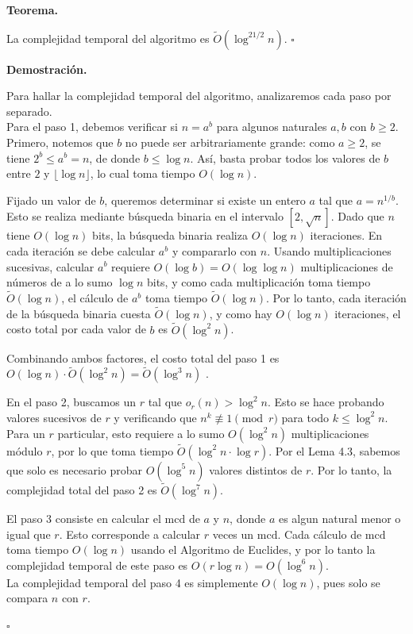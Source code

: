 \documentclass{article}
\newenvironment{dem}{\par\noindent\textbf{Demostración.}\par}{\hfill$\square$\par}
\newenvironment{teo}{\par\noindent\textbf{Teorema.}\par}{\hfill$\square$\par}
\begin{document}
\begin{teo}
La complejidad temporal del algoritmo es $\tilde{O}(\log^{21/2} n)$.
\end{teo}

\begin{dem}
Para hallar la complejidad temporal del algoritmo, analizaremos cada paso por separado. \\
Para el paso 1, debemos verificar si $n = a^b$ para algunos naturales $a, b$ con $b \geq 2$.
Primero, notemos que $b$ no puede ser arbitrariamente grande: como $a \geq 2$, se tiene
$2^b \leq a^b = n$, de donde $b \leq \log n$. Así, basta probar todos los valores de $b$
entre $2$ y $\lfloor \log n \rfloor$, lo cual toma tiempo $O(\log n)$.

Fijado un valor de $b$, queremos determinar si existe un entero $a$ tal que $a = n^{1/b}$.
Esto se realiza mediante búsqueda binaria en el intervalo $[2, \sqrt{n}]$. Dado que $n$
tiene $O(\log n)$ bits, la búsqueda binaria realiza $O(\log n)$ iteraciones. En cada
iteración se debe calcular $a^b$ y compararlo con $n$. Usando multiplicaciones sucesivas,
calcular $a^b$ requiere $O(\log b) = O(\log \log n)$ multiplicaciones de números de a lo
sumo $\log n$ bits, y como cada multiplicación toma tiempo $\tilde{O}(\log n)$, el cálculo
de $a^b$ toma tiempo $\tilde{O}(\log n)$. Por lo tanto, cada iteración de la búsqueda
binaria cuesta $\tilde{O}(\log n)$, y como hay $O(\log n)$ iteraciones, el costo total
por cada valor de $b$ es $\tilde{O}(\log^2 n)$.

Combinando ambos factores, el costo total del paso 1 es $O(\log n) \cdot \tilde{O}(\log^2 n)
= \tilde{O}(\log^3 n)$ \cite{vzGG99}.

En el paso 2, buscamos un $r$ tal que $o_r(n) > \log^2 n$. Esto se hace probando
valores sucesivos de $r$ y verificando que $n^k \not\equiv 1 \pmod{r}$ para todo
$k \leq \log^2 n$. Para un $r$ particular, esto requiere a lo sumo $O(\log^2 n)$
multiplicaciones módulo $r$, por lo que toma tiempo $\tilde{O}(\log^2 n \cdot \log r)$.
Por el Lema 4.3, sabemos que solo es necesario probar $O(\log^5 n)$ valores distintos
de $r$. Por lo tanto, la complejidad total del paso 2 es $\tilde{O}(\log^7 n)$.

El paso 3 consiste en calcular el $\text{mcd}$ de $a$ y $n$, donde $a$ es algun natural menor o igual que $r$.
Esto corresponde a calcular $r$ veces un $\text{mcd}$. Cada cálculo de
$\text{mcd}$ toma tiempo $O(\log n)$ \cite{vzGG99} usando el Algoritmo de Euclides, y por lo tanto la complejidad temporal de este
paso es $O(r \log n) = O(\log^6 n)$. \\
La complejidad temporal del paso 4 es simplemente
$O(\log n)$, pues solo se compara $n$ con $r$.


\end{dem}
\end{document}
